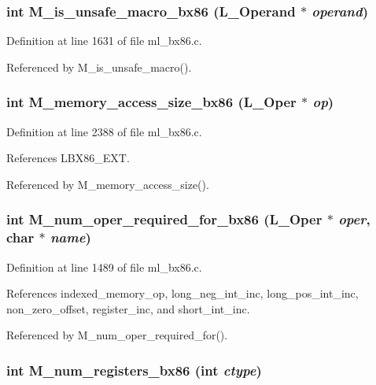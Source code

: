 \subsubsection{\setlength{\rightskip}{0pt plus 5cm}int M\_\-is\_\-unsafe\_\-macro\_\-bx86 (L\_\-Operand $\ast$ {\em operand})}\label{m__bx86_8h_1641727022261783bf341bb62216872b}




Definition at line 1631 of file ml\_\-bx86.c.

Referenced by M\_\-is\_\-unsafe\_\-macro().
\subsubsection{\setlength{\rightskip}{0pt plus 5cm}int M\_\-memory\_\-access\_\-size\_\-bx86 (L\_\-Oper $\ast$ {\em op})}\label{m__bx86_8h_fdf7accdeedba6010af1be1d4758a219}




Definition at line 2388 of file ml\_\-bx86.c.

References LBX86\_\-EXT.

Referenced by M\_\-memory\_\-access\_\-size().
\subsubsection{\setlength{\rightskip}{0pt plus 5cm}int M\_\-num\_\-oper\_\-required\_\-for\_\-bx86 (L\_\-Oper $\ast$ {\em oper}, char $\ast$ {\em name})}\label{m__bx86_8h_53c0f60a4d9e96d06f27d77bbe81a130}




Definition at line 1489 of file ml\_\-bx86.c.

References indexed\_\-memory\_\-op, long\_\-neg\_\-int\_\-inc, long\_\-pos\_\-int\_\-inc, non\_\-zero\_\-offset, register\_\-inc, and short\_\-int\_\-inc.

Referenced by M\_\-num\_\-oper\_\-required\_\-for().
\subsubsection{\setlength{\rightskip}{0pt plus 5cm}int M\_\-num\_\-registers\_\-bx86 (int {\em ctype})}\label{m__bx86_8h_ed639861180b50ad6923f4bdac8b2ed4}




